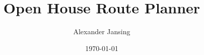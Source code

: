 \documentclass[letterpaper,11pt]{report}
\title{Open House Route Planner}
\author{Alexander Jansing}
\date{\today} %
\theoremstyle{definition}
\theoremstyle{definition}
\begin{document}
%
\nocite{*}

\begin{romanpages}      %
    \ApprovalPage   %
    \TitlePage 
    \CopyrightPage  %
    
    
    
    
    
    
    
    \StylePage
    \tableofcontents
    
    \listoffigures
    \listoftables
    
\end{romanpages}        %


\normalem       %
\end{document}
